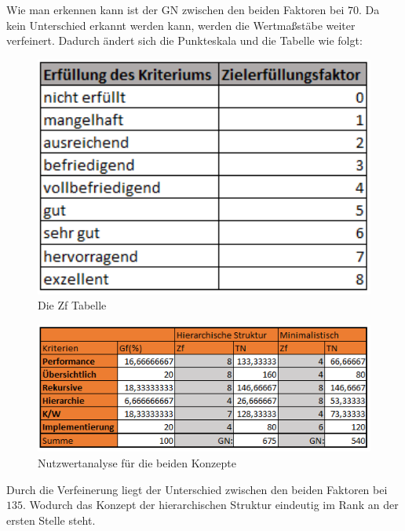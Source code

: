 Wie man erkennen kann ist der \ac{GN} zwischen den beiden Faktoren bei $70$.
Da kein Unterschied erkannt werden kann, werden die Wertmaßstäbe weiter verfeinert.
Dadurch ändert sich die Punkteskala und die Tabelle wie folgt:
\begin{figure}[h!]
 \centering
 \includegraphics[width=1\textwidth]{gfx/Picture/Ziel2.PNG}
 \caption{Die Zf Tabelle}
 \label{fig:Ziel}
\end{figure}
\newpage
\begin{figure}[h!]
 \centering
 \includegraphics[width=1\textwidth]{gfx/Picture/Nutzwert2.PNG}
 \caption{Nutzwertanalyse für die beiden Konzepte}
 \label{fig:Nutz}
\end{figure}
Durch die Verfeinerung liegt der Unterschied zwischen den beiden Faktoren bei $135$.
Wodurch das Konzept der hierarchischen Struktur eindeutig im Rank an der ersten Stelle steht.

